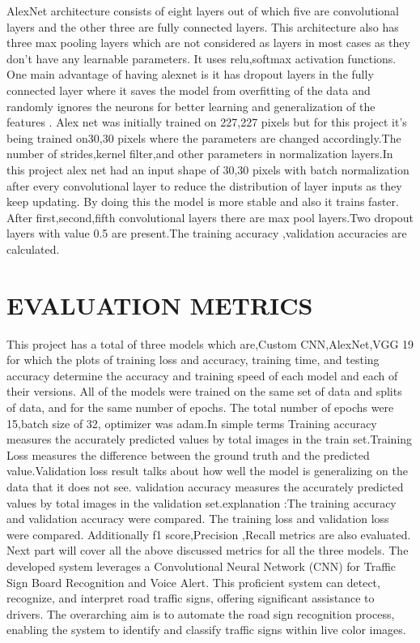 \documentclass[conference]{IEEEtran}
\begin{document}
AlexNet architecture consists of eight layers out of which five are convolutional layers and the other three are fully connected layers. This architecture also has three max pooling layers which are not considered as layers in most cases as they don't have any learnable parameters. It uses relu,softmax activation functions. One main advantage of having alexnet is it has dropout layers in the fully connected layer where it saves the model from overfitting of the data and randomly ignores the neurons for better learning and generalization of the features . Alex net was initially trained on 227,227 pixels but for this project it’s being trained on30,30 pixels where the parameters are changed accordingly.The number of strides,kernel filter,and other parameters in normalization layers.In this project alex net had an input shape of 30,30 pixels with batch normalization after every convolutional layer to reduce the distribution of layer inputs as they keep updating. By doing this the model is more stable and also it trains faster. After first,second,fifth convolutional layers there are max pool layers.Two dropout layers with value 0.5 are present.The training accuracy ,validation accuracies are calculated.
 

\section{EVALUATION METRICS}
This project has a total of three models which are,Custom CNN,AlexNet,VGG 19 for which the plots of training loss and accuracy, training time, and testing accuracy determine the accuracy and training speed of each model and each of their versions. All of the models were trained on the same set of data and splits of data, and for the same number of epochs. The total number of epochs were 15,batch size of 32, optimizer was adam.In simple terms Training accuracy measures the accurately predicted values by total images in the train set.Training Loss measures the difference between the ground truth and the predicted value.Validation loss result talks about how well the model is generalizing on the data that it does not see. validation accuracy  measures the accurately predicted values by total images in the validation set.explanation :The training accuracy and validation accuracy were compared. The training loss and validation loss were compared. Additionally f1 score,Precision ,Recall metrics are also evaluated. Next part will cover all the above discussed metrics for all the three models.
The developed system leverages a Convolutional Neural Network (CNN) for Traffic Sign Board Recognition and Voice Alert. This proficient system can detect, recognize, and interpret road traffic signs, offering significant assistance to drivers. The overarching aim is to automate the road sign recognition process, enabling the system to identify and classify traffic signs within live color images.
\end{document}
